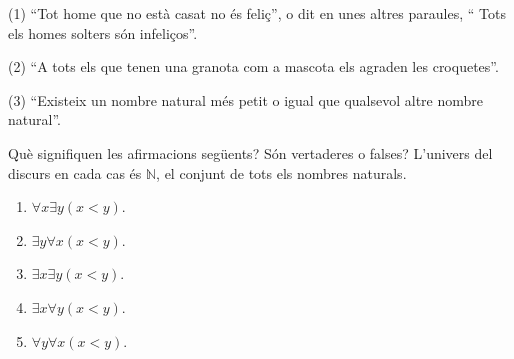 \begin{solucio}
(1) \textquotedblleft Tot home que no est\`{a} casat no \'{e}s
feli\c{c}\textquotedblright, o dit en unes altres paraules, \textquotedblleft
Tots els homes solters s\'{o}n infeli\c{c}os\textquotedblright.

(2) \textquotedblleft A tots els que tenen una granota com a mascota els
agraden les croquetes\textquotedblright.

(3) \textquotedblleft Existeix un nombre natural m\'{e}s petit o igual que
qualsevol altre nombre natural\textquotedblright.
\end{solucio}

\begin{exer}
Qu\`{e} signifiquen les afirmacions seg\"{u}ents? S\'{o}n vertaderes o falses?
L'univers del discurs en cada cas \'{e}s $\mathbb{N}$, el conjunt de tots els
nombres naturals.

\begin{enumerate}
\item $\forall x\exists y(x<y)$.

\item $\exists y\forall x(x<y)$.

\item $\exists x\exists y(x<y)$.

\item $\exists x\forall y(x<y)$.

\item $\forall y\forall x(x<y)$.
\end{enumerate}
\end{exer}


